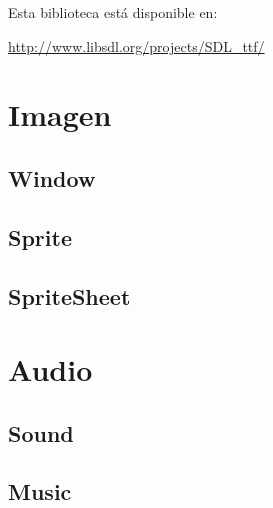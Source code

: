 \documentclass[parskip=half*]{scrartcl}
\begin{document}
	Esta biblioteca est\'a disponible en: \\

	\centerline{\url{http://www.libsdl.org/projects/SDL_ttf/}}


\newpage
\section{Imagen}
	\subsection{Window}

	\subsection{Sprite}

	\subsection{SpriteSheet}


\newpage
\section{Audio}
	\subsection{Sound}

	\subsection{Music}


\newpage
\end{document}
